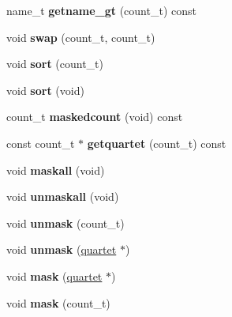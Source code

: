 \begin{DoxyCompactItemize}
\item 
\hypertarget{classsite__t_a33c2db1c5deb3465732ffe1ea7d53b20}{name\-\_\-t {\bfseries getname\-\_\-gt} (count\-\_\-t) const }\label{classsite__t_a33c2db1c5deb3465732ffe1ea7d53b20}

\item 
\hypertarget{classsite__t_a1d7b7dc6b98e46c09675cec69c0d1da8}{void {\bfseries swap} (count\-\_\-t, count\-\_\-t)}\label{classsite__t_a1d7b7dc6b98e46c09675cec69c0d1da8}

\item 
\hypertarget{classsite__t_aa91f382b2bae1f67c96d1f8df7a43a99}{void {\bfseries sort} (count\-\_\-t)}\label{classsite__t_aa91f382b2bae1f67c96d1f8df7a43a99}

\item 
\hypertarget{classsite__t_a0850325b4070b29ef7c9075507933120}{void {\bfseries sort} (void)}\label{classsite__t_a0850325b4070b29ef7c9075507933120}

\item 
\hypertarget{classsite__t_ad605d439cda927cfe2a8732a97b83235}{count\-\_\-t {\bfseries maskedcount} (void) const }\label{classsite__t_ad605d439cda927cfe2a8732a97b83235}

\item 
\hypertarget{classsite__t_a5b61f2b35344033ca9638caa6f518492}{const count\-\_\-t $\ast$ {\bfseries getquartet} (count\-\_\-t) const }\label{classsite__t_a5b61f2b35344033ca9638caa6f518492}

\item 
\hypertarget{classsite__t_ad0423d3589afbbaac552e871048ecfbc}{void {\bfseries maskall} (void)}\label{classsite__t_ad0423d3589afbbaac552e871048ecfbc}

\item 
\hypertarget{classsite__t_a5371c814eb3979acbbf5e2e07707b9a0}{void {\bfseries unmaskall} (void)}\label{classsite__t_a5371c814eb3979acbbf5e2e07707b9a0}

\item 
\hypertarget{classsite__t_a0230dd35643b0fe374176bb594e6f726}{void {\bfseries unmask} (count\-\_\-t)}\label{classsite__t_a0230dd35643b0fe374176bb594e6f726}

\item 
\hypertarget{classsite__t_ac839fde011f6c7a6efc27bb8520f03b0}{void {\bfseries unmask} (\hyperlink{structquartet}{quartet} $\ast$)}\label{classsite__t_ac839fde011f6c7a6efc27bb8520f03b0}

\item 
\hypertarget{classsite__t_a545211490b8d760a1d097bac980e7186}{void {\bfseries mask} (\hyperlink{structquartet}{quartet} $\ast$)}\label{classsite__t_a545211490b8d760a1d097bac980e7186}

\item 
\hypertarget{classsite__t_a59a2524394aa1129906ccc3180cc486f}{void {\bfseries mask} (count\-\_\-t)}\label{classsite__t_a59a2524394aa1129906ccc3180cc486f}

\end{DoxyCompactItemize}
